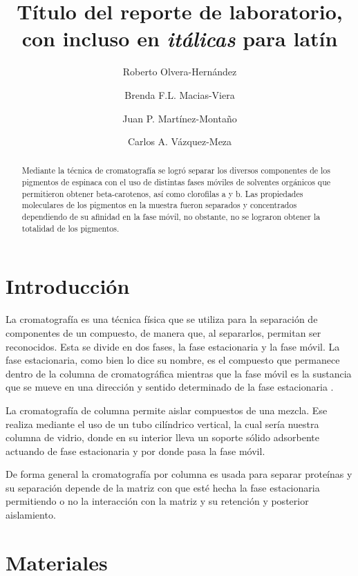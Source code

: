 \documentclass{ITESO-Report}
\title{Título del reporte de laboratorio, con incluso en \textit{itálicas} para latín}
\author[a]{Roberto Olvera-Hernández} %
\author[a]{Brenda F.L. Macias-Viera}
\author[a]{Juan P. Martínez-Montaño}
\author[a]{Carlos A. Vázquez-Meza}
\date{} %
\affil[a]{Ingeniería en biotecnología, \itesoinfo}
\begin{document}
\maketitle %
    \nocite{*} %
    {\small \tableofcontents} %
    \thispagestyle{firstpage} %

\begin{abstract}\label{abstract}
    Mediante la técnica de cromatografía se logró separar los diversos componentes de los pigmentos de espinaca con el uso de distintas fases móviles de solventes orgánicos que permitieron obtener beta-carotenos, así como clorofilas a y b. Las propiedades moleculares de los pigmentos en la muestra fueron separados y concentrados dependiendo de su afinidad en la fase móvil, no obstante, no se lograron obtener la totalidad de los pigmentos.
\end{abstract}

\newpage

\section{Introducción}\label{intro}

La cromatografía es una técnica física que se utiliza para la separación de componentes de un compuesto, de manera que, al separarlos, permitan ser reconocidos. Esta se divide en dos fases, la fase estacionaria y la fase móvil. La fase estacionaria, como bien lo dice su nombre, es el compuesto que permanece dentro de la columna de cromatográfica mientras que la fase móvil es la sustancia que se mueve en una dirección y sentido determinado de la fase estacionaria \parencite{Sgariglia2010}. 

La cromatografía de columna permite aislar compuestos de una mezcla. Ese realiza mediante el uso de un tubo cilíndrico vertical, la cual sería nuestra columna de vidrio, donde en su interior lleva un soporte sólido adsorbente actuando de fase estacionaria y por donde pasa la fase móvil.

De forma general la cromatografía por columna es usada para separar proteínas y su separación depende de la matriz con que esté hecha la fase estacionaria permitiendo o no la interacción con la matriz y su retención y posterior aislamiento.

\section{Materiales}\label{materiales}
\end{document}
